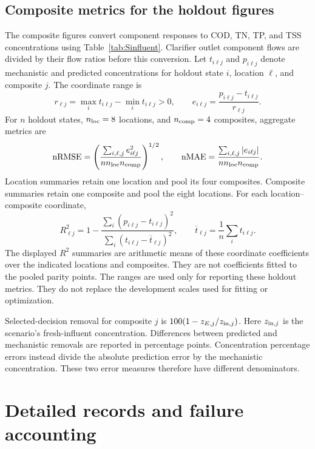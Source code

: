 \documentclass[a4paper,fleqn]{cas-sc}
\begin{document}
\subsection{Composite metrics for the holdout figures}

The composite figures convert component responses to COD, TN, TP, and TSS concentrations using Table~\ref{tab:Sinfluent}. Clarifier outlet component flows are divided by their flow ratios before this conversion. Let $t_{i\ell j}$ and $p_{i\ell j}$ denote mechanistic and predicted concentrations for holdout state $i$, location $\ell$, and composite $j$. The coordinate range is
\begin{equation}
r_{\ell j}=\max_i t_{i\ell j}-\min_i t_{i\ell j}>0,
\qquad e_{i\ell j}=\frac{p_{i\ell j}-t_{i\ell j}}{r_{\ell j}}.
\end{equation}
For $n$ holdout states, $n_{\rm loc}=8$ locations, and $n_{\rm comp}=4$ composites, aggregate metrics are
\begin{equation}
\mathrm{nRMSE}=\left(\frac{\sum_{i,\ell,j}e_{i\ell j}^{2}}
{n n_{\rm loc} n_{\rm comp}}\right)^{1/2},
\qquad
\mathrm{nMAE}=\frac{\sum_{i,\ell,j}|e_{i\ell j}|}
{n n_{\rm loc} n_{\rm comp}}.
\end{equation}
Location summaries retain one location and pool its four composites. Composite summaries retain one composite and pool the eight locations. For each location--composite coordinate,
\begin{equation}
R_{\ell j}^{2}=1-\frac{\sum_i(p_{i\ell j}-t_{i\ell j})^{2}}
{\sum_i(t_{i\ell j}-\overline t_{\ell j})^{2}},
\qquad \overline t_{\ell j}=\frac{1}{n}\sum_i t_{i\ell j}.
\end{equation}
The displayed $R^2$ summaries are arithmetic means of these coordinate coefficients over the indicated locations and composites. They are not coefficients fitted to the pooled parity points. The ranges are used only for reporting these holdout metrics. They do not replace the development scales used for fitting or optimization.

Selected-decision removal for composite $j$ is $100(1-z_{E,j}/z_{{\rm in},j})$. Here $z_{{\rm in},j}$ is the scenario's fresh-influent concentration. Differences between predicted and mechanistic removals are reported in percentage points. Concentration percentage errors instead divide the absolute prediction error by the mechanistic concentration. These two error measures therefore have different denominators.

\section{Detailed records and failure accounting}
\end{document}
